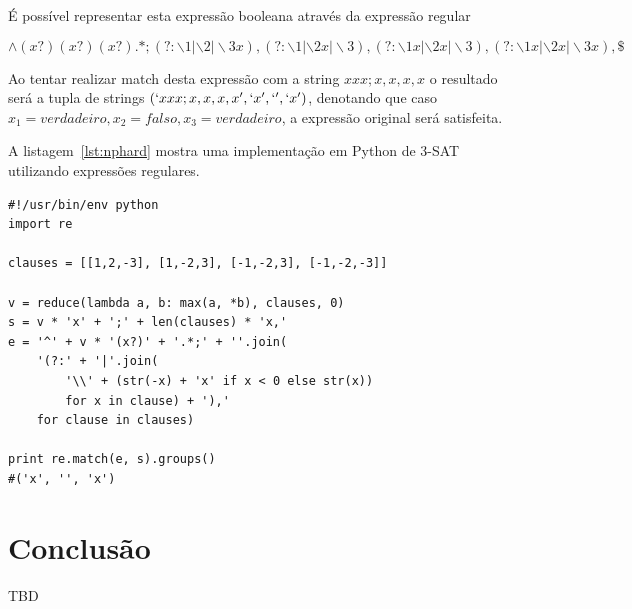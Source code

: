 \documentclass[a4paper,12pt,oneside,onecolumn]{uerj}
\begin{document}
É possível representar esta expressão booleana através da expressão regular

\setlength\abovedisplayskip{0pt}
\begin{equation*}
\wedge (x?)(x?)(x?).*;
                   (?:\backslash 1|\backslash 2|\backslash 3x),
                   (?:\backslash 1|\backslash 2x|\backslash 3),
                   (?:\backslash 1x|\backslash 2x|\backslash 3),
                   (?:\backslash 1x|\backslash 2x|\backslash 3x), \$
\end{equation*}

Ao tentar realizar match desta expressão com a string $xxx;x,x,x,x$ o resultado será a tupla de strings $(`xxx;x,x,x,x', `x', `', `x')$, denotando que caso $x_1 = verdadeiro, x_2 = falso, x_3 = verdadeiro$, a expressão original será satisfeita.

A listagem~\ref{lst:nphard} mostra uma implementação em Python de 3-SAT utilizando expressões regulares.

\vspace{0.5cm}
\begin{lstlisting}[caption={Implementação de 3SAT com expressões regulares},label=lst:nphard]
#!/usr/bin/env python
import re

clauses = [[1,2,-3], [1,-2,3], [-1,-2,3], [-1,-2,-3]]

v = reduce(lambda a, b: max(a, *b), clauses, 0)
s = v * 'x' + ';' + len(clauses) * 'x,'
e = '^' + v * '(x?)' + '.*;' + ''.join(
    '(?:' + '|'.join(
        '\\' + (str(-x) + 'x' if x < 0 else str(x)) 
        for x in clause) + '),' 
    for clause in clauses)

print re.match(e, s).groups() 
#('x', '', 'x')
\end{lstlisting}

\chapter{Conclusão}

TBD

\backmatter

\appendix

\label{app:full_source}
\end{document}

